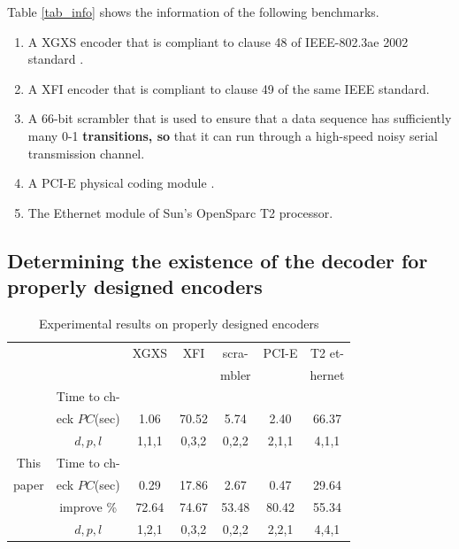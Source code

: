 \documentclass[journal]{IEEEtran}
\begin{document}
Table \ref{tab_info} shows the information of the following benchmarks.
\begin{enumerate}

\item A XGXS encoder that is compliant to clause 48 of IEEE-802.3ae 2002 standard \cite{IEEE80232002}.

\item A XFI encoder that is compliant to clause 49 of the same IEEE standard.

\item A 66-bit scrambler that is used to ensure
that a data sequence has sufficiently many 0-1 \textbf{transitions,
so} that it can run through a high-speed
noisy serial transmission channel.

\item A PCI-E physical coding module \cite{PCIESPEC}.

\item The Ethernet module of Sun's OpenSparc T2 processor.
\end{enumerate}

\subsection{Determining the existence of the decoder for properly designed encoders}\label{subsec_prop}
\begin{table}[b]
\centering
\caption{Experimental results on properly designed encoders}
\begin{tabular}{|c|c|c|c|c|c|c|}
\hline
&                                        &XGXS     &XFI       &scra-     &PCI-E    &T2 et-\\
&                                        &         &          &mbler     &        &hernet\\ \hline
&Time to ch-                           &&&&&\\
\cite{ShengYuShen:fmcad10}&eck $PC$(sec) &1.06     &70.52     &5.74      &2.40    &66.37\\\cline{2-7}
&$d,p,l$                                 &1,1,1    &0,3,2     &0,2,2     &2,1,1   &4,1,1         \\ \hline\hline
This&Time to ch-                         &&&&&\\
paper&eck $PC$(sec)                      &0.29     &17.86     &2.67      &0.47    &29.64\\\cline{2-7}
     &improve \%                         &72.64    &74.67     &53.48     &80.42   &55.34 \\\cline{2-7}
&$d,p,l$                                 &1,2,1    &0,3,2     &0,2,2     &2,2,1   &4,4,1          \\ \hline
\end{tabular}\label{tab_prodes}
\end{table}
\end{document}
